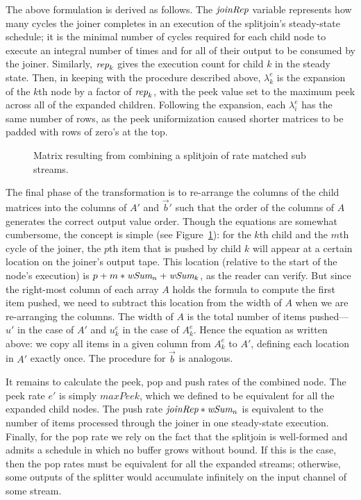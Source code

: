 {The above formulation is derived as follows.  The $\mbox{\it joinRep}$
variable represents how many cycles the joiner completes in an
execution of the splitjoin's steady-state schedule; it is
the minimal number of cycles required for each child node to execute
an integral number of times and for all of their output to be consumed
by the joiner. Similarly, $\mbox{\it rep}_k$ gives the execution count for
child $k$ in the steady state.  Then, in keeping with the procedure
described above, $\lambda_k^e$ is the expansion of the $k$th node by
a factor of $\mbox{\it rep}_k$, with the peek value set to the maximum peek
across all of the expanded children.  Following the expansion, each
$\lambda_i^e$ has the same number of rows, as the peek uniformization
caused shorter matrices to be padded with rows of zero's at the top.

\begin{figure}[t]
\center
\epsfxsize=3.2in
\caption{Matrix resulting from combining a splitjoin of rate matched sub streams.
\protect\label{fig:splitjoin-duplicate-matrix}}
\vspace{-12pt}
\end{figure}

The final phase of the transformation is to re-arrange the columns of
the child matrices into the columns of $A'$ and $\vec{b}'$ such that
the order of the columns of $A$ generates the correct output value
order.  Though the equations are somewhat cumbersome, the concept is
simple (see Figure~\ref{fig:splitjoin-duplicate-matrix}): for the
$k$th child and the $m$th cycle of the joiner, the $p$th item that is
pushed by child $k$ will appear at a certain location on the joiner's
output tape.  This location (relative to the start of the node's
execution) is $p + m * \mbox{\it wSum}_n + \mbox{\it wSum}_k$, as the reader can
verify.  But since the right-most column of each array $A$ holds the
formula to compute the first item pushed, we need to subtract this
location from the width of $A$ when we are re-arranging the
columns. The width of $A$ is the total number of items pushed---$u'$
in the case of $A'$ and $u_k^e$ in the case of $A_k^e$.  Hence the
equation as written above: we copy all items in a given column from
$A_k^e$ to $A'$, defining each location in $A'$ exactly once.  The
procedure for $\vec{b}$ is analogous.

It remains to calculate the peek, pop and push rates of the combined
node.  The peek rate $e'$ is simply $maxPeek$, which we defined to be
equivalent for all the expanded child nodes.  The push rate
$\mbox{\it joinRep}*\mbox{\it wSum}_n$ is equivalent to the number of items
processed through the joiner in one steady-state execution.  Finally,
for the pop rate we rely on the fact that the splitjoin is well-formed
and admits a schedule in which no buffer grows without bound.  If this
is the case, then the pop rates must be equivalent for all the
expanded streams; otherwise, some outputs of the splitter would
accumulate infinitely on the input channel of some stream.

}

